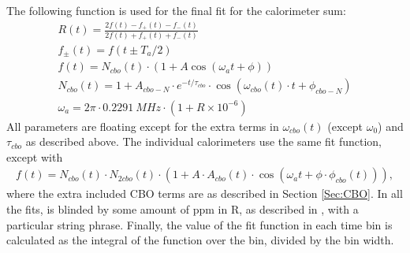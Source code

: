 	The following function is used for the final fit for the calorimeter sum:
	\begin{gather}
			R(t) = \frac{2f(t) - f_{+}(t) - f_{-}(t)}{2f(t) + f_{+}(t) + f_{-}(t)} \\[10pt]
			f_{\pm}(t) = f(t \pm T_{a}/2) \\[10pt]
			f(t) = N_{cbo}(t) \cdot (1 + A \cos(\omega_{a}t + \phi)) \\[10pt]
			N_{cbo}(t) = 1 + A_{cbo-N} \cdot e^{-t/\tau_{cbo}} \cdot \cos(\omega_{cbo}(t) \cdot t + \phi_{cbo-N}) \\[10pt]
			\omega_{a} = 2 \pi \cdot \SI{0.2291}{MHz} \cdot (1 + R \times 10^{-6})
	\end{gather}
	All parameters are floating except for the extra terms in $\omega_{cbo}(t)$ (except $\omega_{0}$) and $\tau_{cbo}$ as described above. The individual calorimeters use the same fit function, except with 
	\begin{gather}
			f(t) = N_{cbo}(t) \cdot N_{2cbo}(t) \cdot (1 + A \cdot A_{cbo}(t) \cdot \cos(\omega_{a}t + \phi \cdot \phi_{cbo}(t))),
	\end{gather}
	where the extra included CBO terms are as described in Section \ref{Sec:CBO}. In all the fits, \wa is blinded by some amount of ppm in R, as described in , with a particular string phrase. Finally, the value of the fit function in each time bin is calculated as the integral of the function over the bin, divided by the bin width.

